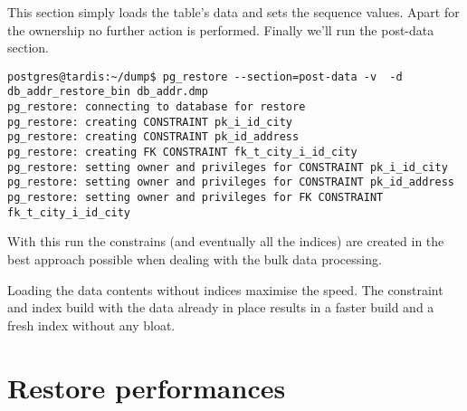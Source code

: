 This section simply loads the table's data and sets the sequence values. Apart for the ownership no 
further action is performed. Finally we'll run the post-data section.

\begin{verbatim}
postgres@tardis:~/dump$ pg_restore --section=post-data -v  -d db_addr_restore_bin db_addr.dmp 
pg_restore: connecting to database for restore
pg_restore: creating CONSTRAINT pk_i_id_city
pg_restore: creating CONSTRAINT pk_id_address
pg_restore: creating FK CONSTRAINT fk_t_city_i_id_city
pg_restore: setting owner and privileges for CONSTRAINT pk_i_id_city
pg_restore: setting owner and privileges for CONSTRAINT pk_id_address
pg_restore: setting owner and privileges for FK CONSTRAINT fk_t_city_i_id_city

\end{verbatim}

With this run the constrains (and eventually all the indices) are created in the best 
approach possible when dealing with the bulk data processing. \newline

Loading the data contents without indices maximise the speed. The constraint and index build with 
the data already in place results in a faster build and a fresh index without any bloat.

\section{Restore performances}


